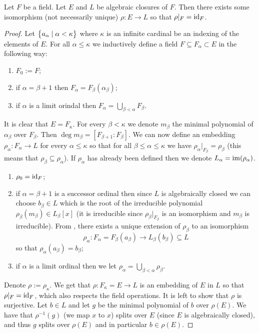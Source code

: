 \documentclass[11pt,a4paper]{article}
\begin{document}
\begin{proposition}
  Let $F$ be a field.
  Let $E$ and $L$ be algebraic closures of $F$.
  Then there exists some isomorphism (not necessarily unique)
  $\rho \colon E \to L$ so that $\rho\vert_F = \operatorname{id}_F$.
\end{proposition}
\begin{proof}
  Let $\left\{a_{\alpha} \mid \alpha < \kappa\right\}$ where $\kappa$ is an infinite
  cardinal be an indexing of the elements of $E$.
  For all $\alpha \le \kappa$ we inductively define a field
  $F \subseteq F_{\alpha} \subset E$ in the following way:
  \begin{enumerate}
    \item[(1)] $F_0 := F$;
    \item[(2)] if $\alpha = \beta + 1$
      then $F_{\alpha} = F_{\beta}(\alpha_{\beta})$;
    \item[(3)] if $\alpha$ is a limit orindal then
      $F_{\alpha} = \bigcup\limits_{\beta < \alpha} F_{\beta}$.
  \end{enumerate}
  It is clear that $E = F_{\kappa}$.
  For every $\beta < \kappa$ we denote $m_{\beta}$ the minimal polynomial
  of $\alpha_{\beta}$ over $F_{\beta}$.
  Then $\deg m_{\beta} = \left[F_{\beta+1} : F_{\beta}\right]$.
  We can now define an embedding $\rho_{\alpha} \colon F_{\alpha} \to L$
  for every $\alpha \le \kappa$ so that for all $\beta \le \alpha \le \kappa$
  we have $\rho_{\alpha}\vert_{F_\beta} = \rho_{\beta}$
  (this means that $\rho_{\beta} \subseteq \rho_{\alpha}$).
  If $\rho_{\alpha}$ has already been defined
  then we denote $L_{\alpha} = \operatorname{im}(\rho_{\alpha})$.
  \begin{enumerate}
    \item[(1)] $\rho_0 = \operatorname{id}_F$;
    \item[(2)] if $\alpha = \beta + 1$ is a successor ordinal then
      since $L$ is algebraically closed we can choose $b_{\beta} \in L$
      which is the root of the irreducible polynomial
      $\rho_{\beta}(m_{\beta}) \in L_{\beta}[x]$ (it is irreducible
      since $\rho_{\beta}\vert_{F_{\beta}}$
      is an isomorphism and $m_{\beta}$ is irreducible).
      From ,
      there exists a unique extension of $\rho_{\beta}$ to an isomorphism
      \[
        \rho_{\alpha} \colon
        F_{\alpha} = F_{\beta}(a_{\beta}) \to L_{\beta}(b_{\beta}) \subseteq L
      \]
      so that $\rho_{\alpha}(a_{\beta}) = b_{\beta}$;
    \item[(3)] if $\alpha$ is a limit ordinal then
      we let $\rho_{\alpha} = \bigcup\limits_{\beta < \alpha} \rho_{\beta}$.
  \end{enumerate}
  Denote $\rho := \rho_{\kappa}$.
  We get that $\rho \colon F_{\kappa} = E \to L$
  is an embedding of $E$ in $L$ so that $\rho\vert_{F} = \operatorname{id}_F$,
  which also respects the field operations.
  It is left to show that $\rho$ is surjective.
  Let $b \in L$ and let $g$ be the minimal polynomial of $b$ over $\rho(E)$.
  We have that $\rho^{-1}(g)$ (we map $x$ to $x$) splits over $E$
  (since $E$ is algebraically closed),
  and thus $g$ splits over $\rho(E)$ and in particular $b \in \rho(E)$.
\end{proof}
\end{document}
